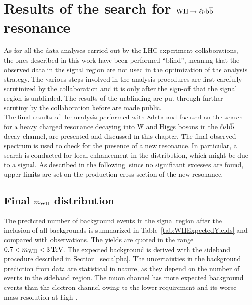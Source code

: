 \chapter{Results of the search for $\mathrm{W}\mathrm{H}\to\ell\nu{\mathrm{b}\overline{\mathrm{b}}}$ resonance}
\label{ch:results8}

As for all the data analyses carried out by the LHC experiment collaborations, the ones described in this work have been performed ``blind'', meaning that the observed data in the signal region are not used in the optimization of the analysis strategy. The various steps involved in the analysis procedures are first carefully scrutinized by the collaboration and it is only after the sign-off that the signal region is unblinded. The results of the unblinding are put through further scrutiny by the collaboration before are made public.\\

The final results of the analysis performed with 8\TeV data and focused on the search for a heavy charged resonance decaying into W and Higgs bosons in the $\ell\nu{\mathrm{b}\overline{\mathrm{b}}}$ decay channel, are presented and discussed in this chapter. The final observed \mWH spectrum is used to check for the presence of a new resonance.
In particular, a search is conducted for local enhancement in the \mWH distribution, which might be due to a signal. 
As described in the following, since no significant excesses are found, upper limits are set on the production cross section of the new resonance.

\section{Final $m_{\rm WH}$ distribution}\label{sec:mWH8TeV}

The predicted number of background events in the signal region after the inclusion of all backgrounds is summarized in Table~\ref{tab:WHExpectedYields} and compared with observations.
The yields are quoted in the range $0.7 < m_{\rm WH} < 3\,\text{Te\hspace{-.08em}V}$. The expected background is derived with the sideband procedure described in Section~\ref{sec:alpha}.
The uncertainties in the background prediction from data are statistical in nature, as they depend on the number of events in the sideband region.
The muon channel has more expected background events than the electron channel owing to the lower \ETmiss requirement and its worse mass resolution at high \pt.


